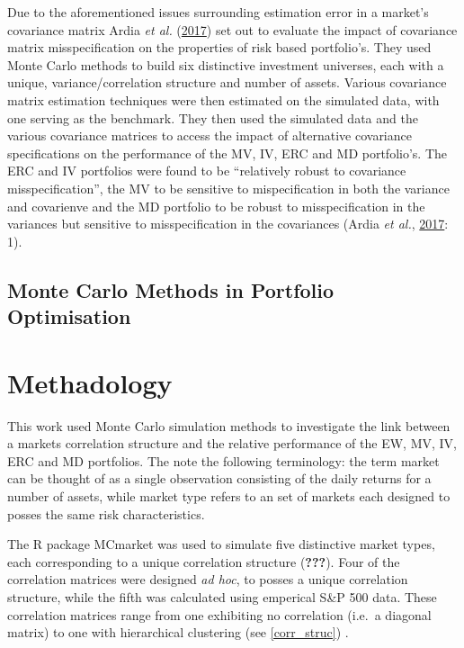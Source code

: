 \documentclass[11pt,preprint, authoryear]{elsarticle}
\numberwithin{equation}{section}
\numberwithin{figure}{section}
\numberwithin{table}{section}
\begin{document}
Due to the aforementioned issues surrounding estimation error in a
market's covariance matrix Ardia \emph{et al.}
(\protect\hyperlink{ref-ardia2017}{2017}) set out to evaluate the impact
of covariance matrix misspecification on the properties of risk based
portfolio's. They used Monte Carlo methods to build six distinctive
investment universes, each with a unique, variance/correlation structure
and number of assets. Various covariance matrix estimation techniques
were then estimated on the simulated data, with one serving as the
benchmark. They then used the simulated data and the various covariance
matrices to access the impact of alternative covariance specifications
on the performance of the MV, IV, ERC and MD portfolio's. The ERC and IV
portfolios were found to be ``relatively robust to covariance
misspecification'', the MV to be sensitive to mispecification in both
the variance and covarienve and the MD portfolio to be robust to
misspecification in the variances but sensitive to misspecification in
the covariances (Ardia \emph{et al.},
\protect\hyperlink{ref-ardia2017}{2017}: 1).

\hypertarget{monte-carlo-methods-in-portfolio-optimisation}{%
\subsection{Monte Carlo Methods in Portfolio
Optimisation}\label{monte-carlo-methods-in-portfolio-optimisation}}

\hypertarget{methadology}{%
\section{Methadology}\label{methadology}}

This work used Monte Carlo simulation methods to investigate the link
between a markets correlation structure and the relative performance of
the EW, MV, IV, ERC and MD portfolios. The note the following
terminology: the term market can be thought of as a single observation
consisting of the daily returns for a number of assets, while market
type refers to an set of markets each designed to posses the same risk
characteristics.

The R package MCmarket was used to simulate five distinctive market
types, each corresponding to a unique correlation structure
({\textbf{???}}). Four of the correlation matrices were designed
\emph{ad hoc}, to posses a unique correlation structure, while the fifth
was calculated using emperical S\&P 500 data. These correlation matrices
range from one exhibiting no correlation (i.e.~a diagonal matrix) to one
with hierarchical clustering (see \ref{corr_struc}) .
\end{document}
